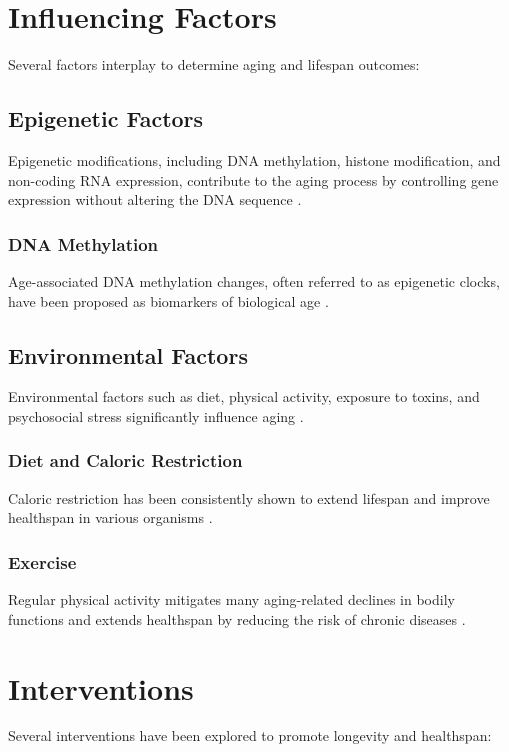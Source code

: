 \documentclass[a4paper,12pt]{article}
\begin{document}
\section{Influencing Factors}
Several factors interplay to determine aging and lifespan outcomes:

\subsection{Epigenetic Factors}
Epigenetic modifications, including DNA methylation, histone modification, and non-coding RNA expression, contribute to the aging process by controlling gene expression without altering the DNA sequence \cite{campo2012epigenetics}.

\subsubsection{DNA Methylation}
Age-associated DNA methylation changes, often referred to as epigenetic clocks, have been proposed as biomarkers of biological age \cite{horvath2013dna}.

\subsection{Environmental Factors}
Environmental factors such as diet, physical activity, exposure to toxins, and psychosocial stress significantly influence aging \cite{adler1994social}.

\subsubsection{Diet and Caloric Restriction}
Caloric restriction has been consistently shown to extend lifespan and improve healthspan in various organisms \cite{mattson2017intermittent}.

\subsubsection{Exercise}
Regular physical activity mitigates many aging-related declines in bodily functions and extends healthspan by reducing the risk of chronic diseases \cite{radak2019exercise}.

\section{Interventions}
Several interventions have been explored to promote longevity and healthspan:
\end{document}

